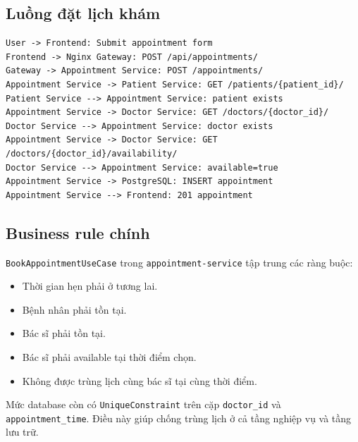 \documentclass[12pt,a4paper]{report}
\begin{document}
\subsection{Luồng đặt lịch khám}
\begin{lstlisting}[style=code,caption={Sequence đặt lịch khám healthcare}]
User -> Frontend: Submit appointment form
Frontend -> Nginx Gateway: POST /api/appointments/
Gateway -> Appointment Service: POST /appointments/
Appointment Service -> Patient Service: GET /patients/{patient_id}/
Patient Service --> Appointment Service: patient exists
Appointment Service -> Doctor Service: GET /doctors/{doctor_id}/
Doctor Service --> Appointment Service: doctor exists
Appointment Service -> Doctor Service: GET /doctors/{doctor_id}/availability/
Doctor Service --> Appointment Service: available=true
Appointment Service -> PostgreSQL: INSERT appointment
Appointment Service --> Frontend: 201 appointment
\end{lstlisting}

\subsection{Business rule chính}
\texttt{BookAppointmentUseCase} trong \texttt{appointment-service} tập trung các ràng buộc:
\begin{itemize}
  \item Thời gian hẹn phải ở tương lai.
  \item Bệnh nhân phải tồn tại.
  \item Bác sĩ phải tồn tại.
  \item Bác sĩ phải available tại thời điểm chọn.
  \item Không được trùng lịch cùng bác sĩ tại cùng thời điểm.
\end{itemize}

Mức database còn có \texttt{UniqueConstraint} trên cặp \texttt{doctor\_id} và \texttt{appointment\_time}. Điều này giúp chống trùng lịch ở cả tầng nghiệp vụ và tầng lưu trữ.
\end{document}
